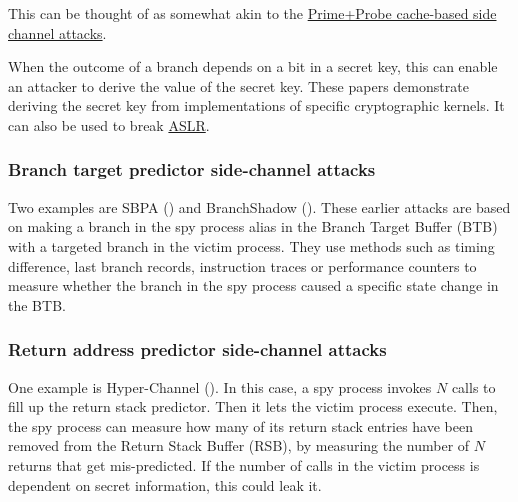 \documentclass[
  a4paper,
]{report}
\begin{document}
This can be thought of as somewhat akin to the
\hyperref[primeprobe]{Prime+Probe cache-based side channel attacks}.

When the outcome of a branch depends on a bit in a secret key, this can
enable an attacker to derive the value of the secret key. These papers
demonstrate deriving the secret key from implementations of specific
cryptographic kernels. It can also be used to break
\hyperref[aslr]{\label{__index_entry_153}{ASLR}}.

\subsubsection{Branch target predictor side-channel
attacks}\label{branch-target-predictor-side-channel-attacks}

\label{__index_entry_154}{}

Two examples are
\label{__index_entry_155}{SBPA}
() and
\label{__index_entry_156}{BranchShadow}
(). These earlier attacks are
based on making a branch in the spy process alias in the
\label{__index_entry_157}{Branch Target Buffer
(BTB)} with a targeted branch in the
victim process. They use methods such as timing difference,
\label{__index_entry_158}{last branch
records},
\label{__index_entry_159}{instruction
traces} or
\label{__index_entry_160}{performance
counters} to measure whether the branch in
the spy process caused a specific state change in the BTB.

\subsubsection{Return address predictor side-channel
attacks}\label{return-address-predictor-side-channel-attacks}

\label{__index_entry_161}{}

One example is
\label{__index_entry_162}{Hyper-Channel}
(). In this case, a spy process
invokes \(N\) calls to fill up the return stack predictor. Then it lets
the victim process execute. Then, the spy process can measure how many
of its return stack entries have been removed from the Return Stack
Buffer (RSB), by measuring the number of \(N\) returns that get
mis-predicted. If the number of calls in the victim process is dependent
on secret information, this could leak it.
\end{document}
